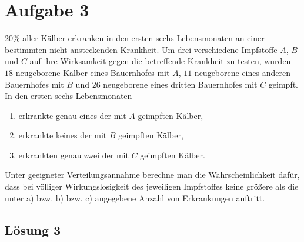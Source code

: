 \documentclass[main.tex]{subfiles}
\begin{document}
\section{Aufgabe 3}
$20\%$ aller Kälber erkranken in den ersten sechs Lebensmonaten an einer bestimmten nicht ansteckenden Krankheit. Um drei verschiedene Impfstoffe $A$, $B$ und $C$ auf ihre Wirksamkeit gegen die betreffende Krankheit zu testen, wurden $18$ neugeborene Kälber eines Bauernhofes mit $A$, $11$ neugeborene eines anderen Bauernhofes mit $B$ und $26$ neugeborene eines dritten Bauernhofes mit $C$ geimpft. In den ersten sechs Lebensmonaten
\begin{enumerate}
	\item erkrankte genau eines der mit $A$ geimpften Kälber,
	\item erkrankte keines der mit $B$ geimpften Kälber,
	\item erkrankten genau zwei der mit $C$ geimpften Kälber.
\end{enumerate}
Unter geeigneter Verteilungsannahme berechne man die Wahrscheinlichkeit dafür, dass bei völliger Wirkungslosigkeit des jeweiligen Impfstoffes keine größere als die unter a) bzw. b) bzw. c) angegebene Anzahl von Erkrankungen auftritt.

\subsection{Lösung 3}
\end{document}
